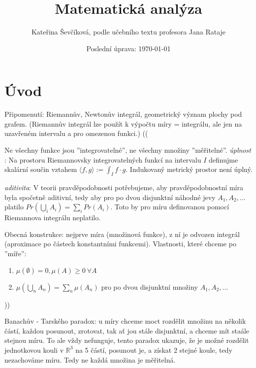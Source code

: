 \documentclass{article}
\title{Matematická analýza}
\author{Kateřina Ševčíková, podle učebního textu profesora Jana Rataje}
\date{Poslední úprava: \today}
\theoremstyle{definition}
\begin{document}
\maketitle

\tableofcontents
\newpage

\section*{Úvod}
Připomenutí: Riemannův, Newtonův integrál, geometrický význam plochy pod
grafem. (Riemannův integrál lze použít k výpočtu míry = integrálu, ale jen na 
uzavřeném intervalu a pro omezenou funkci.)
(( 

Ne všechny funkce jsou ”integrovatelné”, ne všechny množiny ”měřitelné”.
\textit{úplnost} :  Na  prostoru  Riemannovsky  integrovatelných  funkcí  na  intervalu  \(I\) 
definujme skalární součin vztahem   \( \langle f, g\rangle    :=   \int _I  f \cdot g \). 
Indukovaný metrický prostor není úplný.

\textit{aditivita}: V teorii pravděpodobnosti potřebujeme, aby pravděpodobnostní míra  
byla  spočetně aditivní,  tedy  aby  pro  po  dvou  disjunktní  náhodné jevy \(A_1, A_2, . . .\) 
platilo \(Pr(\bigcup _i A_i) = \sum_i Pr(A_i)\).
Toto by pro míru definovanou pomocí Riemannova integrálu neplatilo.

Obecná konstrukce: nejprve  míra (množinová  funkce), z ní  je  odvozen  integrál (aproximace po částech konstantními funkcemi).
Vlastnosti, které chceme po ”míře”:
\begin{enumerate}
    \item \( \mu (\emptyset) = 0, \mu(A) \geq 0 \ \forall A \)
    \item \(\mu(\bigcup _n A_n) = \sum _n \mu(A_n)\) pro po dvou disjunktní množiny \(A_1, A_2, ... \)
\end{enumerate}

 ))

Banachův - Tarského paradox: u míry chceme moct rozdělit množinu na několik částí, 
každou posunout, zrotovat, tak ať jou stále disjunktní, a chceme mít staále stejnou míru.
To ale vždy nefunguje, tento paradox ukazuje, že je možné rozdělit jednotkovou kouli v \(\mathbb{R}^3\) 
na 5 částí, posunout je, a získat 2 stejné koule, tedy nezachováme míru.
Tedy ne každá množina je měřitelná.
\end{document}
